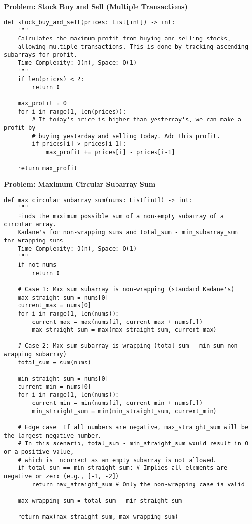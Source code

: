 \noindent\textbf{Problem: Stock Buy and Sell (Multiple Transactions)}
\begin{verbatim}
def stock_buy_and_sell(prices: List[int]) -> int:
    """
    Calculates the maximum profit from buying and selling stocks,
    allowing multiple transactions. This is done by tracking ascending subarrays for profit.
    Time Complexity: O(n), Space: O(1)
    """
    if len(prices) < 2:
        return 0
    
    max_profit = 0
    for i in range(1, len(prices)):
        # If today's price is higher than yesterday's, we can make a profit by
        # buying yesterday and selling today. Add this profit.
        if prices[i] > prices[i-1]:
            max_profit += prices[i] - prices[i-1]
            
    return max_profit
\end{verbatim}

\noindent\textbf{Problem: Maximum Circular Subarray Sum}
\begin{verbatim}
def max_circular_subarray_sum(nums: List[int]) -> int:
    """
    Finds the maximum possible sum of a non-empty subarray of a circular array.
    Kadane's for non-wrapping sums and total_sum - min_subarray_sum for wrapping sums.
    Time Complexity: O(n), Space: O(1)
    """
    if not nums:
        return 0

    # Case 1: Max sum subarray is non-wrapping (standard Kadane's)
    max_straight_sum = nums[0]
    current_max = nums[0]
    for i in range(1, len(nums)):
        current_max = max(nums[i], current_max + nums[i])
        max_straight_sum = max(max_straight_sum, current_max)
    
    # Case 2: Max sum subarray is wrapping (total sum - min sum non-wrapping subarray)
    total_sum = sum(nums)
    
    min_straight_sum = nums[0]
    current_min = nums[0]
    for i in range(1, len(nums)):
        current_min = min(nums[i], current_min + nums[i])
        min_straight_sum = min(min_straight_sum, current_min)
    
    # Edge case: If all numbers are negative, max_straight_sum will be the largest negative number.
    # In this scenario, total_sum - min_straight_sum would result in 0 or a positive value,
    # which is incorrect as an empty subarray is not allowed.
    if total_sum == min_straight_sum: # Implies all elements are negative or zero (e.g., [-1, -2])
        return max_straight_sum # Only the non-wrapping case is valid
    
    max_wrapping_sum = total_sum - min_straight_sum
    
    return max(max_straight_sum, max_wrapping_sum)
\end{verbatim}


